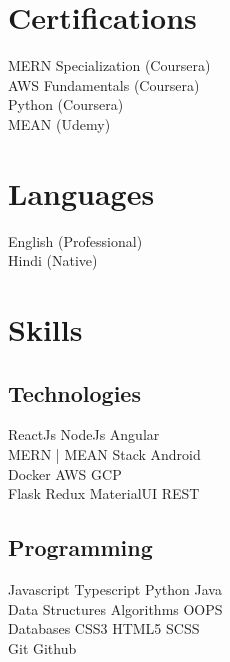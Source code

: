 \documentclass[]{deedy-resume-openfont}
\begin{document}
\begin{minipage}[t]{0.33\textwidth}

\section{Certifications}
MERN Specialization (Coursera) \\
AWS Fundamentals (Coursera) \\
Python (Coursera) \\
MEAN (Udemy) \\
\sectionsep
\section{Languages}
English (Professional) \\
Hindi (Native) \\
\sectionsep

\section{Skills}
\subsection{Technologies}
ReactJs \textbullet{} NodeJs \textbullet{} Angular \\
MERN | MEAN Stack \textbullet{} Android \\
Docker \textbullet{} AWS \textbullet{} GCP \\
Flask \textbullet{} Redux \textbullet{} MaterialUI \textbullet{} REST \\
\sectionsep

\subsection{Programming}
Javascript \textbullet{}   Typescript \textbullet{} Python \textbullet{} Java \\
Data Structures \textbullet{}   Algorithms \textbullet{} OOPS \\
Databases \textbullet{} CSS3 \textbullet{} HTML5 \textbullet{} SCSS \\
Git \textbullet{} Github \\ 
%
%

\end{minipage} 
\end{document}
